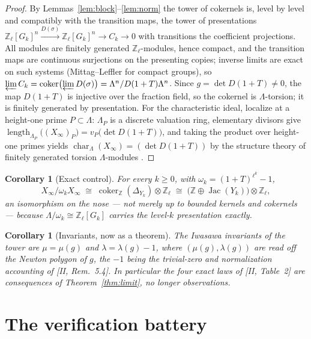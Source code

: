\documentclass[11pt]{amsart}
\numberwithin{equation}{section}
\newtheorem{corollary}[theorem]{Corollary}
\theoremstyle{definition}
\theoremstyle{remark}
\newcommand{\Z}{\mathbb{Z}}
\newcommand{\Zl}{\Z_\ell}
\newcommand{\La}{\Lambda}
\newcommand{\Jac}{\operatorname{Jac}}
\newcommand{\coker}{\operatorname{coker}}
\newcommand{\car}{\operatorname{char}_{\La}}
\begin{document}
\begin{proof}
By Lemmas~\ref{lem:block}--\ref{lem:norm} the tower of cokernels is, level by level
and compatibly with the transition maps, the tower of presentations
$\Zl[G_k]^n\xrightarrow{D(\sigma)}\Zl[G_k]^n\to C_k\to0$ with transitions the
coefficient projections. All modules are finitely generated $\Zl$-modules, hence
compact, and the transition maps are continuous surjections on the presenting
copies; inverse limits are exact on such systems (Mittag--Leffler for compact
groups), so $\varprojlim C_k=\coker\bigl(\varprojlim D(\sigma)\bigr)
=\La^n/D(1+T)\La^n$. Since $g=\det D(1+T)\neq0$, the map $D(1+T)$ is injective over
the fraction field, so the cokernel is $\La$-torsion; it is finitely generated by
presentation. For the characteristic ideal, localize at a height-one prime
$P\subset\La$: $\La_P$ is a discrete valuation ring, elementary divisors give
$\operatorname{length}_{\La_P}\bigl((X_\infty)_P\bigr)=v_P\bigl(\det D(1+T)\bigr)$,
and taking the product over height-one primes yields
$\car(X_\infty)=(\det D(1+T))$ by the structure theory of finitely generated
torsion $\La$-modules \cite{Washington}.
\end{proof}

\begin{corollary}[Exact control]\label{cor:control}
For every $k\ge0$, with $\omega_k=(1+T)^{\ell^k}-1$,
\[
X_\infty\big/\omega_k X_\infty\;\cong\;\coker_\Z(\Delta_{Y_k})\otimes\Zl
\;\cong\;\bigl(\Z\oplus\Jac(Y_k)\bigr)\otimes\Zl ,
\]
an isomorphism on the nose --- not merely up to bounded kernels and cokernels ---
because $\La/\omega_k\cong\Zl[G_k]$ carries the level-$k$ presentation exactly.
\end{corollary}

\begin{corollary}[Invariants, now as a theorem]\label{cor:invariants}
The Iwasawa invariants of the tower are $\mu=\mu(g)$ and $\lambda=\lambda(g)-1$,
where $(\mu(g),\lambda(g))$ are read off the Newton polygon of $g$, the $-1$ being
the trivial-zero and normalization accounting of {\rm[II, Rem.~5.4]}. In particular
the four exact laws of {\rm[II, Table~2]} are consequences of
Theorem~\ref{thm:limit}, no longer observations.
\end{corollary}

\section{The verification battery}\label{sec:battery}
\end{document}
